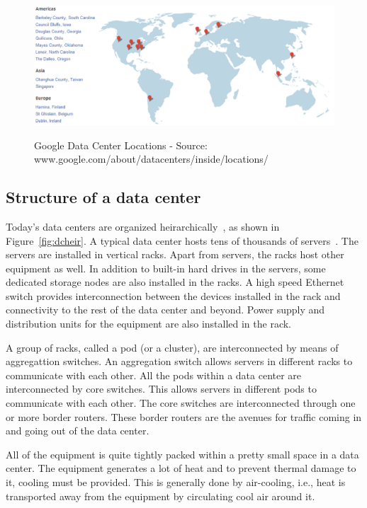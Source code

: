 \begin{figure}
\includegraphics[width=1\textwidth]{pics/googledcmap2.eps}
\label{fig:googledcmap}
\caption{Google Data Center Locations - Source: www.google.com/about/datacenters/inside/locations/}
\end{figure}
\subsection{Structure of a data center} Today's data centers are organized heirarchically~\cite{dcnetworking:vahdat:micro:2010}, as shown in Figure~\ref{fig:dcheir}. A typical data center hosts tens of thousands of servers~\cite{Abts:2012:GTD:2184319.2184335}. The servers are installed in vertical racks. Apart from servers, the racks host other equipment as well. In addition to built-in hard drives in the servers, some dedicated storage nodes are also installed in the racks. A high speed Ethernet switch provides interconnection between the devices installed in the rack and connectivity to the rest of the data center and beyond. Power supply and distribution units for the equipment are also installed in the rack. 

A group of racks, called a pod (or a cluster), are interconnected by means of aggregattion switches. An aggregation switch allows servers in different racks to communicate with each other. All the pods within a data center are interconnected by core switches. This allows servers in different pods to communicate with each other. The core switches are interconnected through one or more border routers. These border routers are the avenues for traffic coming in and going out of the data center. 

All of the equipment is quite tightly packed within a pretty small space in a data center. The equipment generates a lot of heat and to prevent thermal damage to it, cooling must be provided. This is generally done by air-cooling, i.e., heat is transported away from the equipment by circulating cool air around it.


